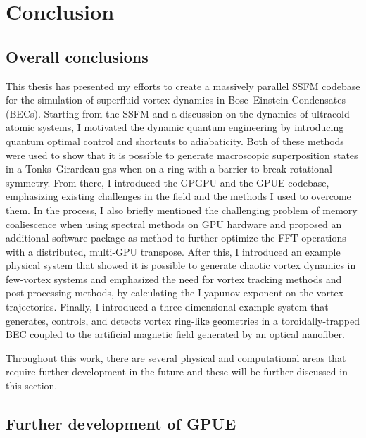 \chapter*{Conclusion}

\section{Overall conclusions}

\label{ch:conclusion}

This thesis has presented my efforts to create a massively parallel SSFM codebase for the simulation of superfluid vortex dynamics in Bose--Einstein Condensates (BECs).
Starting from the SSFM and a discussion on the dynamics of ultracold atomic systems, I motivated the dynamic quantum engineering by introducing quantum optimal control and shortcuts to adiabaticity.
Both of these methods were used to show that it is possible to generate macroscopic superposition states in a Tonks--Girardeau gas when on a ring with a barrier to break rotational symmetry.
From there, I introduced the GPGPU and the GPUE codebase, emphasizing existing challenges in the field and the methods I used to overcome them.
In the process, I also briefly mentioned the challenging problem of memory coaliescence when using spectral methods on GPU hardware and proposed an additional software package as method to further optimize the FFT operations with a distributed, multi-GPU transpose.
After this, I introduced an example physical system that showed it is possible to generate chaotic vortex dynamics in few-vortex systems and emphasized the need for vortex tracking methods and post-processing methods, by calculating the Lyapunov exponent on the vortex trajectories.
Finally, I introduced a three-dimensional example system that generates, controls, and detects vortex ring-like geometries in a toroidally-trapped BEC coupled to the artificial magnetic field generated by an optical nanofiber.

Throughout this work, there are several physical and computational areas that require further development in the future and these will be further discussed in this section.

\section{Further development of GPUE}

